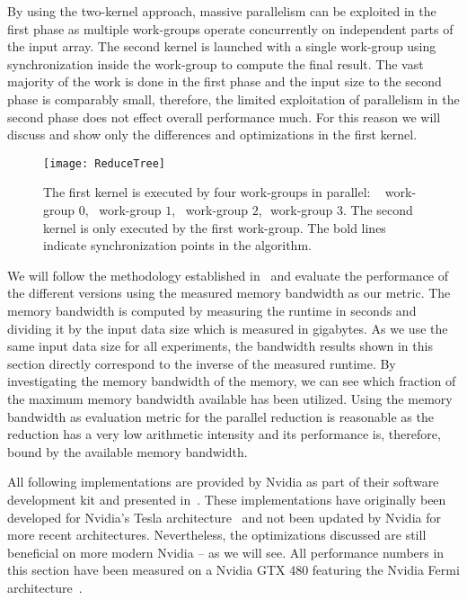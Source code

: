 By using the two-kernel approach, massive parallelism can be exploited in the first phase as multiple work-groups operate concurrently on independent parts of the input array.
The second kernel is launched with a single work-group using synchronization inside the work-group to compute the final result.
The vast majority of the work is done in the first phase and the input size to the second phase is comparably small, therefore, the limited exploitation of parallelism in the second phase does not effect overall performance much.
For this reason we will discuss and show only the differences and optimizations in the first \OpenCL kernel.


\begin{figure}[t]
  \centering
  \texttt{[image: ReduceTree]}
  \caption[Parallel Reduction in \OpenCL.]%
    {The first \OpenCL kernel is executed by four work-groups in parallel:
    \ \protect\firstBox{}\,\,work-group $0$,\ \protect\secondBox{}\,\,work-group $1$,\ \protect\thirdBox{}\,\,work-group $2$, \protect\fourthBox{}\,\,work-group $3$.
           The second \OpenCL kernel is only executed by the first work-group. The bold lines indicate synchronization points in the algorithm.}
  \label{fig:reduce:tree}
\end{figure}

We will follow the methodology established in~\cite{Harris2007} and evaluate the performance of the different versions using the measured \GPU memory bandwidth as our metric.
The memory bandwidth is computed by measuring the runtime in seconds and dividing it by the input data size which is measured in gigabytes.
As we use the same input data size for all experiments, the bandwidth results shown in this section directly correspond to the inverse of the measured runtime.
By investigating the memory bandwidth of the \GPU memory, we can see which fraction of the maximum memory bandwidth available has been utilized.
Using the memory bandwidth as evaluation metric for the parallel reduction is reasonable as the reduction has a very low arithmetic intensity and its performance is, therefore, bound by the available \GPU memory bandwidth.

All following implementations are provided by Nvidia as part of their software development kit and presented in~\cite{Harris2007}.
These implementations have originally been developed for Nvidia's Tesla \GPU architecture~\cite{LindholmNOM2008} and not been updated by Nvidia for more recent \GPU architectures.
Nevertheless, the optimizations discussed are still beneficial on more modern Nvidia \GPUs -- as we will see.
All performance numbers in this section have been measured on a Nvidia GTX 480 \GPU featuring the Nvidia Fermi architecture~\cite{CUDAFermi2009}.

